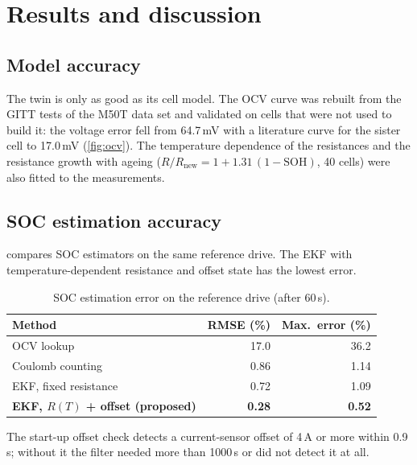 \chapter{Results and discussion}\label{ch:results}

\section{Model accuracy}
The twin is only as good as its cell model. The OCV curve was rebuilt from the GITT tests of the M50T data set and validated on cells that were not used to build it: the voltage error fell from 64.7\,mV with a literature curve for the sister cell \citep{chen2020} to 17.0\,mV (\cref{fig:ocv}). The temperature dependence of the resistances and the resistance growth with ageing ($R/R_\mathrm{new} = 1 + 1.31\,(1-\mathrm{SOH})$, 40 cells) were also fitted to the measurements.


\section{SOC estimation accuracy}
 compares SOC estimators on the same reference drive. The EKF with temperature-dependent resistance and offset state has the lowest error.

\begin{table}[htbp]\centering\small
\caption{SOC estimation error on the reference drive (after 60\,s).}\label{tab:soc}
\begin{tabular}{@{}lrr@{}}\toprule
Method & RMSE (\%) & Max.\ error (\%) \\\midrule
OCV lookup & 17.0 & 36.2 \\
Coulomb counting & 0.86 & 1.14 \\
EKF, fixed resistance & 0.72 & 1.09 \\
\textbf{EKF, $R(T)$ + offset (proposed)} & \textbf{0.28} & \textbf{0.52} \\\bottomrule
\end{tabular}
\end{table}


The start-up offset check detects a current-sensor offset of 4\,A or more within 0.9\,s; without it the filter needed more than 1000\,s or did not detect it at all.

